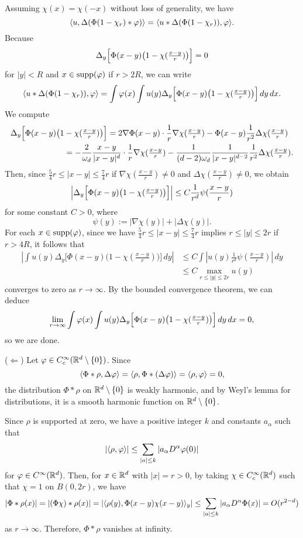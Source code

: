 \documentclass[12pt]{article}
\begin{document}
\begin{pf}
Assuming $\chi(x)=\chi(-x)$ without loss of generality, we have
\[\langle u,\Delta(\Phi(1-\chi_r)*\varphi)\rangle=\langle u*\Delta(\Phi(1-\chi_r)),\varphi\rangle.\]
Because
\[\Delta_y\Bigl[\Phi(x-y)\bigl(1-\chi(\tfrac{x-y}r)\bigr)\Bigr]=0\]
for $|y|<R$ and $x\in\operatorname{supp}(\varphi)$ if $r>2R$, we can write
\[\langle u*\Delta(\Phi(1-\chi_r)),\varphi\rangle
=\int\varphi(x)\int u(y)\Delta_y\Bigl[\Phi(x-y)\bigl(1-\chi(\tfrac{x-y}r)\bigr)\Bigr]\,dy\,dx.\]
We compute
\begin{align*}
\Delta_y\Bigl[\Phi(x-y)\bigl(1&-\chi(\tfrac{x-y}r)\bigr)\Bigr]
=2\nabla\Phi(x-y)\cdot\frac1r\nabla\chi(\tfrac{x-y}r)-\Phi(x-y)\frac1{r^2}\Delta\chi(\tfrac{x-y}r)\\
&=-\frac2{\omega_d}\frac{x-y}{|x-y|^d}\cdot\frac1r\nabla\chi(\tfrac{x-y}r)
-\frac1{(d-2)\omega_d}\frac1{|x-y|^{d-2}}\frac1{r^2}\Delta\chi(\tfrac{x-y}r).
\end{align*}
Then, since $\frac54r\le|x-y|\le\frac74r$ if $\nabla\chi(\tfrac{x-y}r)\ne0$ and $\Delta\chi(\tfrac{x-y}r)\ne0$, we obtain
\[\Bigl|\Delta_y\Bigl[\Phi(x-y)\bigl(1-\chi(\tfrac{x-y}r)\bigr)\Bigr]\Bigr|\le C\frac1{r^d}\psi(\frac{x-y}r)\]
for some constant $C>0$, where
\[\psi(y):=|\nabla\chi(y)|+|\Delta\chi(y)|.\]
For each $x\in\operatorname{supp}(\varphi)$, since we have $\frac54r\le|x-y|\le\frac74r$ implies $r\le|y|\le2r$ if $r>4R$, it follows that
\begin{align*}
|\int u(y)\Delta_y\bigl[\Phi(x-y)\bigl(1-\chi(\tfrac{x-y}r)\bigr)\bigr]\,dy|
&\le C\int|u(y)\frac1{r^d}\psi(\frac{x-y}r)|\,dy\\
&\le C\max_{r\le|y|\le2r}u(y)
\end{align*}
converges to zero as $r\to\infty$.
By the bounded convergence theorem, we can deduce
\[\lim_{r\to\infty}\int\varphi(x)\int u(y)\Delta_y\Bigl[\Phi(x-y)\bigl(1-\chi(\tfrac{x-y}r)\bigr)\Bigr]\,dy\,dx=0,\]
so we are done.

($\Leftarrow$)
Let $\varphi\in C_c^\infty(\mathbb{R}^d\setminus\{0\})$.
Since
\[\langle\Phi*\rho,\Delta\varphi\rangle=\langle\rho,\Phi*(\Delta\varphi)\rangle=\langle\rho,\varphi\rangle=0,\]
the distribution $\Phi*\rho$ on $\mathbb{R}^d\setminus\{0\}$ is weakly harmonic, and by Weyl's lemma for distributions, it is a smooth harmonic function on $\mathbb{R}^d\setminus\{0\}$.

Since $\rho$ is supported at zero, we have a positive integer $k$ and constants $a_\alpha$ such that
\[|\langle\rho,\varphi\rangle|\le\sum_{|a|\le k}|a_\alpha D^\alpha\varphi(0)|\]
for $\varphi\in C^\infty(\mathbb{R}^d)$.
Then, for $x\in\mathbb{R}^d$ with $|x|=r>0$, by taking $\chi\in C_c^\infty(\mathbb{R}^d)$ such that $\chi=1$ on $B(0,2r)$, we have
\[|\Phi*\rho(x)|=|(\Phi\chi)*\rho(x)|=|\langle\rho(y),\Phi(x-y)\chi(x-y)\rangle_y|\le\sum_{|a|\le k}|a_\alpha D^\alpha\Phi(x)|=O(r^{2-d})\]
as $r\to\infty$.
Therefore, $\Phi*\rho$ vanishes at infinity.
\end{pf}
\end{document}
